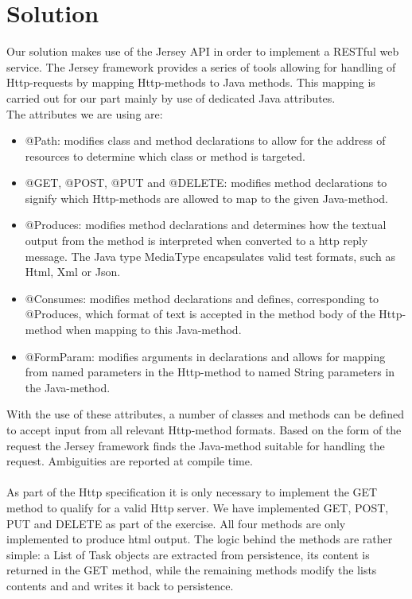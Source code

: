 \section{Solution}
\label{rest_solution}
Our solution makes use of the Jersey API in order to implement a RESTful web service. The Jersey framework provides a series of tools allowing for handling of Http-requests by mapping Http-methods to Java methods. This mapping is carried out for our part mainly by use of dedicated Java attributes.\\
The attributes we are using are:\\
\begin{itemize}
	\item @Path: modifies class and method declarations to allow for the address of resources to determine which class or method is targeted.
	\item @GET, @POST, @PUT and @DELETE: modifies method declarations to signify which Http-methods are allowed to map to the given Java-method.
	\item @Produces: modifies method declarations and determines how the textual output from the method is interpreted when converted to a http reply message. The Java type MediaType encapsulates valid test formats, such as Html, Xml or Json.
	\item @Consumes: modifies method declarations and defines, corresponding to @Produces, which format of text is accepted in the method body of the Http-method when mapping to this Java-method. 
	\item @FormParam: modifies arguments in declarations and allows for mapping from named parameters in the Http-method to named String parameters in the Java-method.
\end{itemize}
With the use of these attributes, a number of classes and methods can be defined to accept input from all relevant Http-method formats. Based on the form of the request the Jersey framework finds the Java-method suitable for handling the request. Ambiguities are reported at compile time.\\\\
As part of the Http specification it is only necessary to implement the GET method to qualify for a valid Http server. We have implemented GET, POST, PUT and DELETE as part of the exercise. All four methods are only implemented to produce html output. The logic behind the methods are rather simple: a List of Task objects are extracted from persistence, its content is returned in the GET method, while the remaining methods modify the lists contents and and writes it back to persistence.\\


